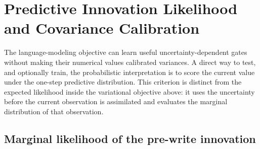 \documentclass[11pt]{article}
\begin{document}
\section{Predictive Innovation Likelihood and Covariance Calibration}
\label{sec:discussion-predictive-innovation-likelihood}

The language-modeling objective can learn useful uncertainty-dependent gates without making their
numerical values calibrated variances. A direct way to test, and optionally train, the probabilistic
interpretation is to score the current value under the one-step predictive distribution. This
criterion is distinct from the expected likelihood inside the variational objective above: it uses
the uncertainty before the current observation is assimilated and evaluates the marginal
distribution of that observation.

\subsection{Marginal likelihood of the pre-write innovation}
\end{document}
